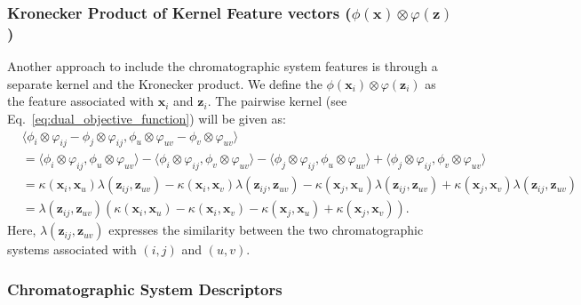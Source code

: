 \documentclass[10p]{article}
\newcommand{\x}{\mathbf{x}}
\newcommand{\z}{\mathbf{z}}
\newcommand{\molkern}{\kappa}
\newcommand{\syskern}{\lambda}
\begin{document}
\subsubsection{Kronecker Product of Kernel Feature vectors ($\phi(\x)\otimes\varphi(\z)$)}

Another approach to include the chromatographic system features is through a separate kernel and the Kronecker product. We define the $\phi(\x_i)\otimes\varphi(\z_i)$ as the feature associated with $\x_i$ and $\z_i$. The pairwise kernel (see Eq.~\eqref{eq:dual_objective_function}) will be given as:
\begin{align}
    &\langle\phi_i\otimes\varphi_{ij}-\phi_j\otimes\varphi_{ij},\phi_u\otimes\varphi_{uv}-\phi_v\otimes\varphi_{uv}\rangle\\
        &=\langle\phi_i\otimes\varphi_{ij},\phi_u\otimes\varphi_{uv}\rangle
         -\langle\phi_i\otimes\varphi_{ij},\phi_v\otimes\varphi_{uv}\rangle
         -\langle\phi_j\otimes\varphi_{ij},\phi_u\otimes\varphi_{uv}\rangle
         +\langle\phi_j\otimes\varphi_{ij},\phi_v\otimes\varphi_{uv}\rangle\\
        &=\molkern(\x_i,\x_u)\syskern(\z_{ij},\z_{uv})
         -\molkern(\x_i,\x_v)\syskern(\z_{ij},\z_{uv})
         -\molkern(\x_j,\x_u)\syskern(\z_{ij},\z_{uv})
         +\molkern(\x_j,\x_v)\syskern(\z_{ij},\z_{uv})\\
        &=\syskern(\z_{ij},\z_{uv})(\molkern(\x_i,\x_u)-\molkern(\x_i,\x_v)-\molkern(\x_j,\x_u)+\molkern(\x_j,\x_v)).
\end{align}
Here, $\syskern(\z_{ij},\z_{uv})$ expresses the similarity between the two chromatographic systems associated with $(i,j)$ and $(u,v)$.

\subsubsection{Chromatographic System Descriptors}



\newpage
\printbibliography
\end{document}
